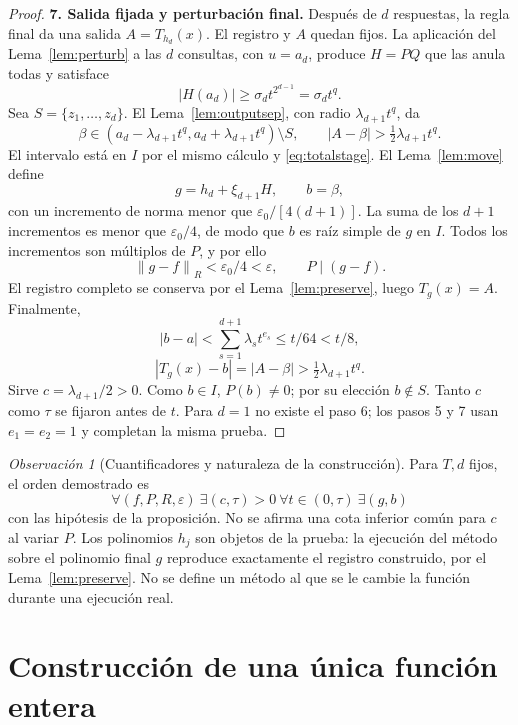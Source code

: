 \documentclass[11pt,a4paper]{article}
\numberwithin{equation}{section}
\theoremstyle{definition}
\theoremstyle{remark}
\newtheorem{remark}[theorem]{Observación}
\newcommand{\norm}[1]{\left\lVert#1\right\rVert}
\newcommand{\paso}[1]{\par\smallskip\noindent\textbf{#1}\quad}
\begin{document}
\begin{proof}
\paso{7. Salida fijada y perturbación final.}
Después de $d$ respuestas, la regla final da una salida $A=T_{h_d}(x)$. El registro y $A$ quedan fijos. La aplicación del Lema~\ref{lem:perturb} a las $d$ consultas, con $u=a_d$, produce $H=PQ$ que las anula todas y satisface
\[
|H(a_d)|\ge\sigma_dt^{2^{d-1}}=\sigma_dt^q.
\]
Sea $S=\{z_1,\ldots,z_d\}$. El Lema~\ref{lem:outputsep}, con radio $\lambda_{d+1}t^q$, da
\[
\beta\in(a_d-\lambda_{d+1}t^q,a_d+\lambda_{d+1}t^q)\setminus S,
\qquad |A-\beta|>\tfrac12\lambda_{d+1}t^q.
\]
El intervalo está en $I$ por el mismo cálculo y \eqref{eq:totalstage}. El Lema~\ref{lem:move} define
\[
g=h_d+\xi_{d+1}H,\qquad b=\beta,
\]
con un incremento de norma menor que $\varepsilon_0/[4(d+1)]$. La suma de los $d+1$ incrementos es menor que $\varepsilon_0/4$, de modo que $b$ es raíz simple de $g$ en $I$. Todos los incrementos son múltiplos de $P$, y por ello
\[
\norm{g-f}_R<\varepsilon_0/4<\varepsilon,\qquad P\mid(g-f).
\]
El registro completo se conserva por el Lema~\ref{lem:preserve}, luego $T_g(x)=A$. Finalmente,
\[
|b-a|<\sum_{s=1}^{d+1}\lambda_st^{e_s}\le t/64<t/8,
\]
\[
|T_g(x)-b|=|A-\beta|>\tfrac12\lambda_{d+1}t^q.
\]
Sirve $c=\lambda_{d+1}/2>0$. Como $b\in I$, $P(b)\ne0$; por su elección $b\notin S$. Tanto $c$ como $\tau$ se fijaron antes de $t$. Para $d=1$ no existe el paso 6; los pasos 5 y 7 usan $e_1=e_2=1$ y completan la misma prueba.
\end{proof}

\begin{remark}[Cuantificadores y naturaleza de la construcción]\label{rem:quantifiers}
Para $T,d$ fijos, el orden demostrado es
\[
\forall(f,P,R,\varepsilon)\ \exists(c,\tau)>0\ 
\forall t\in(0,\tau)\ \exists(g,b)
\]
con las hipótesis de la proposición. No se afirma una cota inferior común para $c$ al variar $P$. Los polinomios $h_j$ son objetos de la prueba: la ejecución del método sobre el polinomio final $g$ reproduce exactamente el registro construido, por el Lema~\ref{lem:preserve}. No se define un método al que se le cambie la función durante una ejecución real.
\end{remark}

\clearpage
\section{Construcción de una única función entera}\label{sec:limit}
\end{document}
